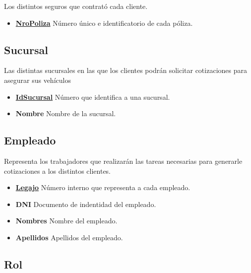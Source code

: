 \documentclass[a4paper,11pt]{article}
\begin{document}
Los distintos seguros que contrató cada cliente.

\begin{itemize}
   
  \item \textbf{\uline{NroPoliza}} Número único e identificatorio de cada póliza.
      
\end{itemize}

\subsection{Sucursal}

Las distintas sucursales en las que los clientes podrán solicitar cotizaciones para asegurar sus vehículos

\begin{itemize}
   
  \item \textbf{\uline{IdSucursal}} Número que identifica a una sucursal.
  
  \item \textbf{Nombre} Nombre de la sucursal.
  
\end{itemize}

\subsection{Empleado}

Representa los trabajadores que realizarán las tareas necesarias para generarle cotizaciones
a los distintos clientes.

\begin{itemize}
   
  \item \textbf{\uline{Legajo}} Número interno que representa a cada empleado.
  
  \item \textbf{DNI} Documento de indentidad del empleado.
  
  \item \textbf{Nombres} Nombre del empleado.
  
  \item \textbf{Apellidos} Apellidos del empleado.
  
\end{itemize}

\subsection{Rol}
\end{document}
